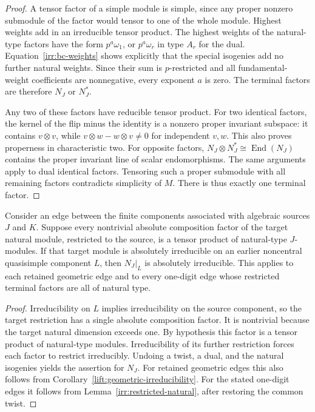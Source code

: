 \begin{proof}
A tensor factor of a simple module is simple, since any proper nonzero
submodule of the factor would tensor to one of the whole module.
Highest weights add in an irreducible tensor product.
The highest weights of the natural-type factors have the form
$p^a\omega_1$, or $p^a\omega_r$ in type $A_r$ for the dual.
Equation~\eqref{irr:bc-weights} shows explicitly that the special isogenies
add no further natural weights.
Since their sum is $p$-restricted and all fundamental-weight coefficients
are nonnegative, every exponent $a$ is zero.
The terminal factors are therefore $N_J$ or $N_J^*$.

Any two of these factors have reducible tensor product.
For two identical factors, the kernel of the flip minus the identity is
a nonzero proper invariant subspace: it contains $v\otimes v$, while
$v\otimes w-w\otimes v\ne0$ for independent $v,w$.
This also proves properness in characteristic two.
For opposite factors, $N_J\otimes N_J^*\cong\operatorname{End}(N_J)$
contains the proper invariant line of scalar endomorphisms.
The same arguments apply to dual identical factors.
Tensoring such a proper submodule with all remaining factors contradicts
simplicity of $M$.  There is thus exactly one terminal factor.
\end{proof}

\begin{lemma}
\label{irr:natural-tail}
Consider an edge between the finite components associated with algebraic
sources $J$ and $K$.  Suppose every nontrivial absolute composition factor
of the target natural module, restricted to the source, is a tensor product
of natural-type $J$-modules.  If that target module is absolutely irreducible
on an earlier noncentral quasisimple component $L$, then $N_J|_L$ is
absolutely irreducible.
This applies to each retained geometric edge and to every one-digit edge
whose restricted terminal factors are all of natural type.
\end{lemma}

\begin{proof}
Irreducibility on $L$ implies irreducibility on the source component, so
the target restriction has a single absolute composition factor.
It is nontrivial because the target natural dimension exceeds one.
By hypothesis this factor is a tensor product of natural-type modules.
Irreducibility of its further restriction forces each factor to restrict
irreducibly.  Undoing a twist, a dual, and the natural isogenies yields the
assertion for $N_J$.
For retained geometric edges this also follows from
Corollary~\ref{lift:geometric-irreducibility}.  For the stated one-digit edges it follows
from Lemma~\ref{irr:restricted-natural}, after restoring the common twist.
\end{proof}

